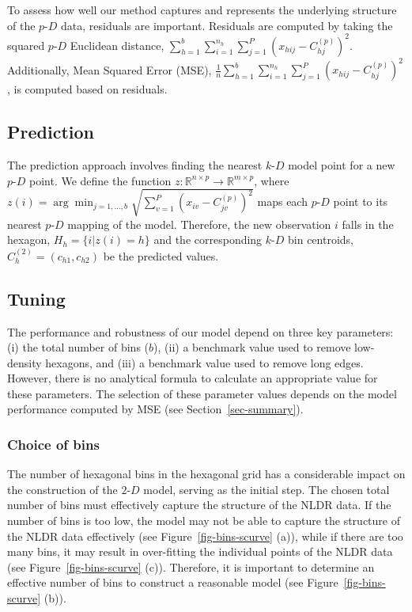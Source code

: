 \documentclass[
  12pt]{article}
\newcommand\pD{$p\text{-}D$}
\newcommand\kD{$k\text{-}D$}
\newcommand\gD{$2\text{-}D$}
\begin{document}
To assess how well our method captures and represents the underlying
structure of the \pD{} data, residuals are important. Residuals are
computed by taking the squared \pD{} Euclidean distance,
\(\sum_{h = 1}^{b}\sum_{i = 1}^{n_h}\sum_{j = 1}^{P} (x_{hij} - C^{(p)}_{hj})^2\).
Additionally, Mean Squared Error (MSE),
\(\frac{1}{n}\sum_{h = 1}^{b}\sum_{i = 1}^{n_h}\sum_{j = 1}^{P} (x_{hij} - C^{(p)}_{hj})^2\),
is computed based on residuals.

\subsection{Prediction}\label{prediction}

The prediction approach involves finding the nearest \kD{} model point
for a new \pD{} point. We define the function
\(z: \mathbb{R}^{n\times p} \rightarrow \mathbb{R}^{m\times p}\), where
\(z(i) = \arg\min_{j = 1, \dots, b} \sqrt{\sum_{v=1}^{P}(x_{iv} - C^{(p)}_{jv})^2}\)
maps each \pD{} point to its nearest \pD{} mapping of the model.
Therefore, the new observation \(i\) falls in the hexagon,
\(H_h = \{i| z(i) = h\}\) and the corresponding \kD{} bin centroids,
\(C_{h}^{(2)} = (c_{h1}, c_{h2})\) be the predicted values.

\subsection{Tuning}\label{tuning}

The performance and robustness of our model depend on three key
parameters: (i) the total number of bins (\(b\)), (ii) a benchmark value
used to remove low-density hexagons, and (iii) a benchmark value used to
remove long edges. However, there is no analytical formula to calculate
an appropriate value for these parameters. The selection of these
parameter values depends on the model performance computed by MSE (see
Section~\ref{sec-summary}).

\subsubsection{Choice of bins}\label{choice-of-bins}

The number of hexagonal bins in the hexagonal grid has a considerable
impact on the construction of the \gD{} model, serving as the initial
step. The chosen total number of bins must effectively capture the
structure of the NLDR data. If the number of bins is too low, the model
may not be able to capture the structure of the NLDR data effectively
(see Figure~\ref{fig-bins-scurve} (a)), while if there are too many
bins, it may result in over-fitting the individual points of the NLDR
data (see Figure~\ref{fig-bins-scurve} (c)). Therefore, it is important
to determine an effective number of bins to construct a reasonable model
(see Figure~\ref{fig-bins-scurve} (b)).
\end{document}
